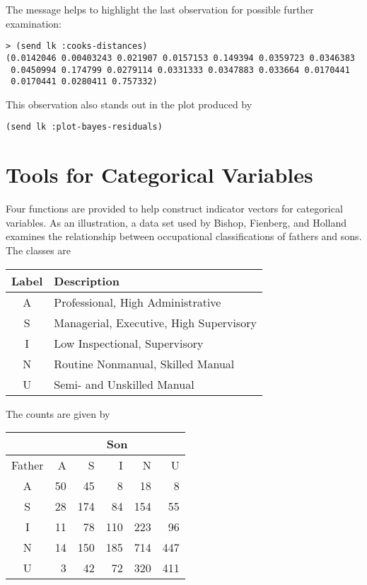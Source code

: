 The  message helps to highlight the last
observation for possible further examination:
\begin{verbatim}
> (send lk :cooks-distances)
(0.0142046 0.00403243 0.021907 0.0157153 0.149394 0.0359723 0.0346383
 0.0450994 0.174799 0.0279114 0.0331333 0.0347883 0.033664 0.0170441 
 0.0170441 0.0280411 0.757332)
\end{verbatim}
This observation also stands out in the plot produced by
\begin{verbatim}
(send lk :plot-bayes-residuals)
\end{verbatim}

\section{Tools for Categorical Variables}
Four functions are provided to help construct indicator vectors for
categorical variables. As an illustration, a data set used by Bishop,
Fienberg, and Holland examines the relationship between occupational
classifications of fathers and sons. The classes are
\begin{center}
\begin{tabular}{|c|l|}
\hline
Label & Description\\
\hline
A     & Professional, High Administrative\\
S     & Managerial, Executive, High Supervisory\\
I     & Low Inspectional, Supervisory\\
N     & Routine Nonmanual, Skilled Manual\\
U     & Semi- and Unskilled Manual\\
\hline
\end{tabular}
\end{center}
The counts are given by
\begin{center}
\begin{tabular}{|c|rrrrr|}
\hline
       & \multicolumn{5}{c|}{Son}\\
\hline
Father &  A &   S &   I &   N &   U \\
\hline
 A     & 50 &  45 &   8 &  18 &   8 \\
 S     & 28 & 174 &  84 & 154 &  55 \\
 I     & 11 &  78 & 110 & 223 &  96 \\
 N     & 14 & 150 & 185 & 714 & 447 \\
 U     &  3 &  42 &  72 & 320 & 411 \\
\hline
\end{tabular}
\end{center}

